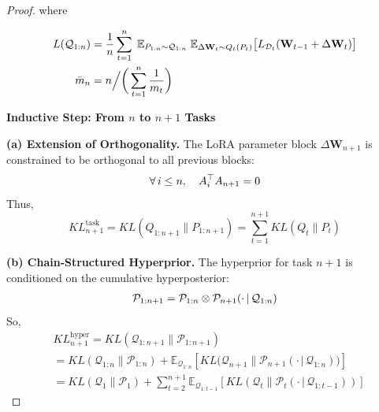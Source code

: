 \documentclass[letterpaper]{article} %
\begin{document}
\begin{proof}
    
    where



\begin{align}
L(\mathcal{Q}_{1:n}) &=  \frac{1}{n} \sum_{t=1}^n\;
    \mathbb{E}_{P_{1:n} \sim \mathcal{Q}_{1:n}}\;
    \mathbb{E}_{\Delta\mathbf{W}_t \sim Q_t(P_t)}
    \big[
        L_{\mathcal{D}_t}(\mathbf{W}_{t-1} + \Delta\mathbf{W}_t)
    \big] \notag \\
\bar{m}_n &=
    n \Big/ \bigg( \sum_{t=1}^n \frac{1}{m_t} \bigg) \notag
\end{align}


\textbf{Inductive Step: From $n$ to $n+1$ Tasks}


\textbf{(a) Extension of Orthogonality.}
The LoRA parameter block $\Delta\mathbf{W}_{n+1}$ is constrained to be orthogonal to all previous blocks:
    \begin{align}
        \forall\, i \leq n, \quad A_i^\top A_{n+1} = 0 \notag
    \end{align}
    Thus,
    \begin{equation}
        KL^{\text{task}}_{n+1}=KL(Q_{1:n+1} \| P_{1:n+1}) = \sum_{t=1}^{n+1} KL(Q_t \| P_t)
    \end{equation}

\textbf{(b) Chain-Structured Hyperprior.}
    The hyperprior for task $n+1$ is conditioned on the cumulative hyperposterior:
    \begin{align}
        \mathcal{P}_{1:n+1} = \mathcal{P}_{1:n} \otimes \mathcal{P}_{n+1}(\cdot\,|\,\mathcal{Q}_{1:n}) \notag
    \end{align}
    So,
    \begin{equation}
        \begin{aligned}
        &KL^{\text{hyper}}_{n+1}
        =KL(\mathcal{Q}_{1:n+1} \| \mathcal{P}_{1:n+1}) \\
        &= KL(\mathcal{Q}_{1:n} \| \mathcal{P}_{1:n}) +\mathbb{E}_{\mathcal{Q}_{1:n}}\left[ KL\big(\mathcal{Q}_{n+1} \| \mathcal{P}_{n+1}(\cdot\,|\,\mathcal{Q}_{1:n})\big) \right] 
        \\
        &= KL(\mathcal{Q}_1 \| \mathcal{P}_1) +
         \sum_{t=2}^{n+1} \mathbb{E}_{\mathcal{Q}_{1:t-1}}\left[ KL\left(\mathcal{Q}_t \| \mathcal{P}_t(\cdot\,|\,\mathcal{Q}_{1:t-1})\right) \right]
    \end{aligned}
    \end{equation}



\end{proof}
\end{document}

